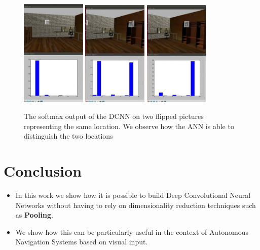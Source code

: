 \documentclass[a0, portrait]{IWIposter}
\begin{document}
\begin{multicols}{3}
\begin{figure}
        \includegraphics[width=0.275\textwidth]{position1.png}
        \hfill
        \includegraphics[width=0.275\textwidth]{position2.png}
	\hfill
	\includegraphics[width=0.275\textwidth]{position3.png}
	\caption{The softmax output of the DCNN on two flipped pictures representing the same location. We observe 		  how the ANN is able to distinguish the two locations}
	\label{fig:SoftmaxOutput}
\end{figure}



\section*{Conclusion}

\begin{itemize}
	\item In this work we show how it is possible to build Deep Convolutional Neural Networks without having to rely on dimensionality reduction techniques such as \textbf{Pooling}.
	\item We show how this can be particularly useful in the context of Autonomous Navigation Systems based on visual input. 

\end{itemize}




\end{multicols}
\end{document}
